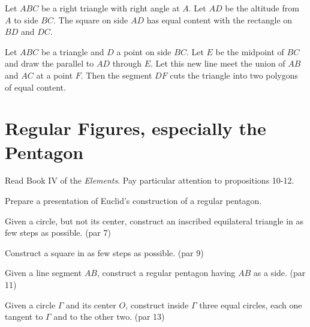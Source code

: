 \begin{conjecture}\label{conj:right-triangle-similarity}
Let $ABC$ be a right triangle with right angle at $A$. Let $AD$ be the altitude from $A$ to side $BC$. The square on side $AD$ has equal content with the rectangle on $BD$ and $DC$.
\end{conjecture}

\begin{conjecture}\label{conj:divide-triangle}
Let $ABC$ be a triangle and $D$ a point on side $BC$. Let $E$ be the midpoint of $BC$ and draw the parallel to $AD$ through $E$. Let this new line meet the union of $AB$ and $AC$ at a point $F$. Then the segment $DF$ cuts the triangle into two polygons of equal content.
\end{conjecture}



\chapter{Regular Figures, especially the Pentagon}

Read Book IV of the \emph{Elements}. Pay particular attention to propositions 10-12.

\begin{problem}\label{prob:GSP-reg-pentagon}
Prepare a presentation of Euclid's construction of a regular pentagon.
\end{problem}

\begin{problem}\label{prob:circle-inscribe-triangle} Given a circle, but not its center, construct an inscribed equilateral triangle in as few steps as possible. (par 7)
\end{problem}

\begin{problem}\label{prob:square}
Construct a square in as few steps as possible. (par 9)
\end{problem}

\begin{problem}\label{prob:side-reg-pent}
Given a line segment $AB$, construct a regular pentagon having $AB$ as a side. (par 11)
\end{problem}

\begin{problem}\label{prob:circle-three-tangent-circles}
Given a circle $\Gamma$ and its center $O$, construct inside $\Gamma$ three equal circles, each one tangent to $\Gamma$ and to the other two. (par 13)
\end{problem}

